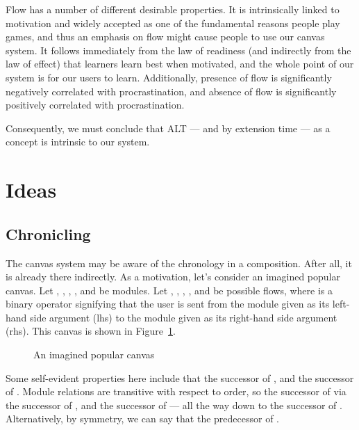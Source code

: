 \documentclass{article}
\begin{document}
\begin{multicols}{2}
Flow has a number of different desirable properties. It is intrinsically 
linked to motivation and widely accepted as one of the fundamental reasons 
people play games\cite{murphy2011games}, and thus an emphasis on flow might 
cause people to use our canvas system. It follows immediately from the law of 
readiness (and indirectly from the law of effect) that learners learn best 
when motivated\cite{murphy2011games}, and the whole point of our system is for 
our users to learn. Additionally, presence of flow is significantly negatively 
correlated with procrastination, and absence of flow is significantly 
positively correlated with procrastination\cite{lee2005relationship}.

Consequently, we must conclude that ALT --- and by extension time --- as a 
concept is intrinsic to our system.
 
\section{Ideas}
\subsection{Chronicling}
\label{chronology}
The canvas system may be aware of the chronology in a composition. After all, 
it is already there indirectly. As a motivation, let's consider an imagined 
popular canvas. Let , , , , and  be modules. Let , , , , and  be possible flows, where  is 
a binary operator signifying that the user is sent from the module given as 
its left-hand side argument (lhs) to the module given as its right-hand side 
argument (rhs). This canvas is shown in Figure~\ref{canvas}.

\begin{figure}[H]
\begin{centering}
\caption{An imagined popular canvas}
\label{canvas}
\end{centering}
\end{figure}

Some self-evident properties here include that the successor of , and 
the successor of . Module relations are transitive with respect 
to order, so the successor of  via the successor of , and the 
successor of  --- all the way down to the successor of . 
Alternatively, by symmetry, we can say that the predecessor of .


\end{multicols}
\end{document}

